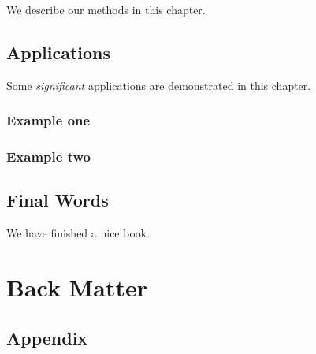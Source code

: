 \documentclass[]{book}
\begin{document}
We describe our methods in this chapter.

\hypertarget{applications}{%
\chapter{Applications}\label{applications}}

Some \emph{significant} applications are demonstrated in this chapter.

\hypertarget{example-one}{%
\section{Example one}\label{example-one}}

\hypertarget{example-two}{%
\section{Example two}\label{example-two}}

\hypertarget{final-words}{%
\chapter{Final Words}\label{final-words}}

We have finished a nice book.

\hypertarget{part-back-matter}{%
\part*{Back Matter}\label{part-back-matter}}

\hypertarget{appendix}{%
\chapter*{Appendix}\label{appendix}}


\end{document}
